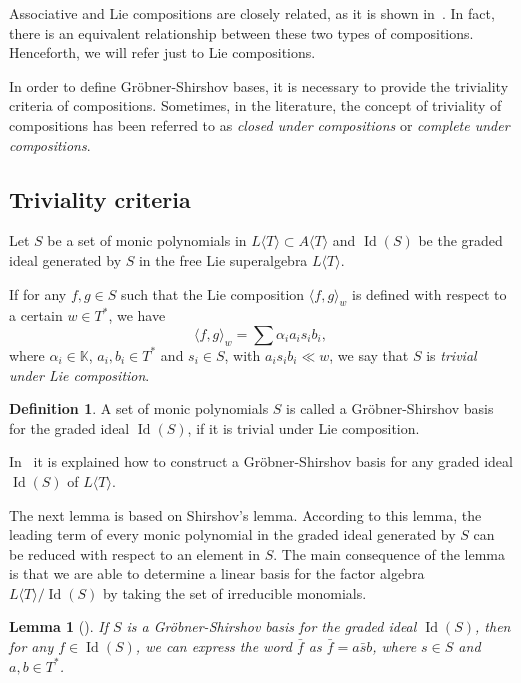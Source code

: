 \documentclass[reqno]{amsart}
\newtheorem{lemma}[theorem]{Lemma}
\theoremstyle{definition}
\newtheorem{definition}[theorem]{Definition}
\theoremstyle{remark}
\numberwithin{equation}{section}
\DeclareMathOperator{\Id}{Id}
\begin{document}
Associative and Lie compositions are closely related, as it is shown in~\cite[Lemma 2.7 and Theorem 2.8]{B2}. In fact, there is an equivalent relationship between these two types of compositions. Henceforth, we will refer just to Lie compositions.

In order to define Gr\"obner-Shirshov bases, it is necessary to provide the triviality criteria of compositions. Sometimes, in the literature, the concept of triviality of compositions has been referred to as \emph{closed under compositions} or \emph{complete under compositions}.
\subsection*{Triviality criteria}
Let $S$ be a set of monic polynomials in $L\langle T \rangle \subset A\langle T \rangle$ and $\Id(S)$ be the graded ideal generated by $S$ in the free Lie superalgebra $L\langle T \rangle$.

If for any $f,g\in S$ such that the Lie composition $\langle f,g\rangle_w$ is defined with respect to a certain $w\in T^*$, we have \[\langle f,g\rangle_w= \sum \alpha_i a_i s_i b_i ,\]
where $\alpha_i \in \mathbb{K}$, $a_i , b_i \in T^{\ast}$ and $s_i \in S$, with $a_is_ib_i \ll w$, we say that $S$ is \emph{trivial under Lie composition}.

\begin{definition}
A set of monic polynomials $S$ is called a Gr\"obner-Shirshov basis for the graded ideal $\Id(S)$, if it is trivial under Lie composition.
\end{definition}

In~\cite{B2} it is explained how to construct a Gr\"obner-Shirshov basis for any graded ideal $\Id(S)$ of $L\langle T\rangle$.

The next lemma is based on Shirshov's lemma. According to this lemma, the leading term of every monic polynomial in the graded ideal generated by $S$ can be reduced with respect to an element in $S$. The main consequence of the lemma is that we are able to determine a linear basis for the factor algebra $L\langle T \rangle /\Id(S)$ by taking the set of irreducible monomials.
\begin{lemma}[\cite{S1}] \label{L:GS}
If $S$ is a Gr\"obner-Shirshov basis for the graded ideal $\Id(S)$, then for any $f \in \Id(S)$, we can express the word $\bar{f}$ as $\bar{f}=a\bar{s}b$, where $s \in S$ and $a,b \in T^{\ast}$.
\end{lemma}
\end{document}
